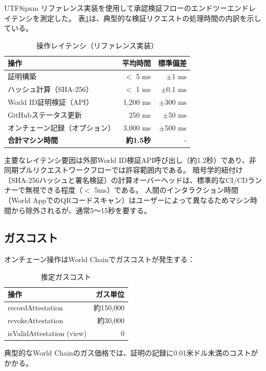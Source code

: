 \documentclass[a4paper,10pt]{article}
\begin{document}
\begin{CJK}{UTF8}{ipxm}
リファレンス実装を使用して承認検証フローのエンドツーエンドレイテンシを測定した。
表\ref{tab:latency}は、典型的な検証リクエストの処理時間の内訳を示している。

\begin{table}[h]
\centering
\caption{操作レイテンシ（リファレンス実装）}
\label{tab:latency}
\begin{tabular}{lrr}
\toprule
\textbf{操作} & \textbf{平均時間} & \textbf{標準偏差} \\
\midrule
証明構築 & $<$ 5 ms & $\pm$1 ms \\
ハッシュ計算（SHA-256） & $<$ 1 ms & $\pm$0.1 ms \\
World ID証明検証（API） & 1,200 ms & $\pm$300 ms \\
GitHubステータス更新 & 250 ms & $\pm$50 ms \\
オンチェーン記録（オプション） & 3,000 ms & $\pm$500 ms \\
\midrule
\textbf{合計マシン時間} & \textbf{約1.5秒} & - \\
\bottomrule
\end{tabular}
\end{table}

主要なレイテンシ要因は外部World ID検証API呼び出し（約1.2秒）であり、非同期プルリクエストワークフローでは許容範囲内である。
暗号学的紐付け（SHA-256ハッシュと署名検証）の計算オーバーヘッドは、標準的なCI/CDランナーで無視できる程度（$<$ 5ms）である。
人間のインタラクション時間（World AppでのQRコードスキャン）はユーザーによって異なるためマシン時間から除外されるが、通常5〜15秒を要する。

\subsection{ガスコスト}

オンチェーン操作はWorld Chainでガスコストが発生する：

\begin{table}[h]
\centering
\caption{推定ガスコスト}
\begin{tabular}{lr}
\toprule
\textbf{操作} & \textbf{ガス単位} \\
\midrule
recordAttestation & 約150,000 \\
revokeAttestation & 約30,000 \\
isValidAttestation (view) & 0 \\
\bottomrule
\end{tabular}
\end{table}

典型的なWorld Chainのガス価格では、証明の記録に0.01米ドル未満のコストがかかる。


\end{CJK}
\end{document}

